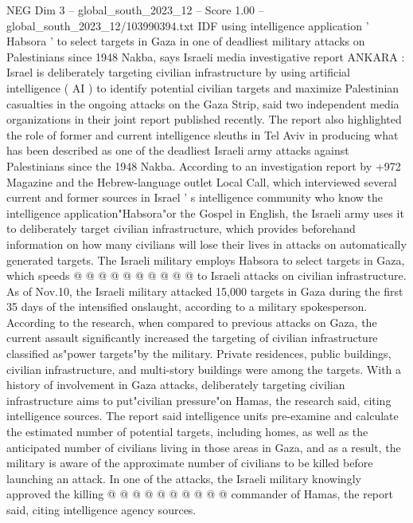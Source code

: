 \begin{textsample}{NEG Dim 3 – global\_south\_2023\_12 – Score 1.00 – global\_south\_2023\_12/103990394.txt}  \label{ex:f3_neg_012}
IDF using intelligence application ' Habsora ' to select targets in Gaza in one of deadliest military attacks on Palestinians since 1948 Nakba, says Israeli media investigative report ANKARA : Israel is deliberately targeting civilian infrastructure by using artificial intelligence ( AI ) to identify potential civilian targets and maximize Palestinian casualties in the ongoing attacks on the Gaza Strip, said two independent media organizations in their joint report published recently.
The report also highlighted the role of former and current intelligence sleuths in Tel Aviv in producing what has been described as one of the deadliest Israeli army attacks against Palestinians since the 1948 Nakba.
According to an investigation report by +972 Magazine and the Hebrew-language outlet Local Call, which interviewed several current and former sources in Israel ' s intelligence community who know the intelligence application"Habsora"or the Gospel in English, the Israeli army uses it to deliberately target civilian infrastructure, which provides beforehand information on how many civilians will lose their lives in attacks on automatically generated targets.
The Israeli military employs Habsora to select targets in Gaza, which speeds @ @ @ @ @ @ @ @ @ @ to Israeli attacks on civilian infrastructure.
As of Nov.10, the Israeli military attacked 15,000 targets in Gaza during the first 35 days of the intensified onslaught, according to a military spokesperson.
According to the research, when compared to previous attacks on Gaza, the current assault significantly increased the targeting of civilian infrastructure classified as"power targets"by the military.
Private residences, public buildings, civilian infrastructure, and multi-story buildings were among the targets.
With a history of involvement in Gaza attacks, deliberately targeting civilian infrastructure aims to put"civilian pressure"on Hamas, the research said, citing intelligence sources.
The report said intelligence units pre-examine and calculate the estimated number of potential targets, including homes, as well as the anticipated number of civilians living in those areas in Gaza, and as a result, the military is aware of the approximate number of civilians to be killed before launching an attack.
In one of the attacks, the Israeli military knowingly approved the killing @ @ @ @ @ @ @ @ @ @ commander of Hamas, the report said, citing intelligence agency sources.

\end{textsample}
